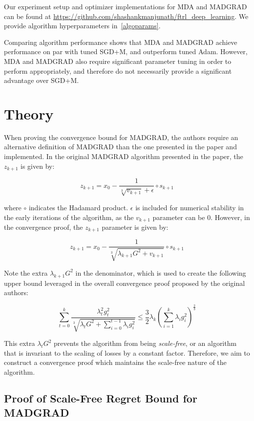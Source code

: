\documentclass{article}
\begin{document}
Our experiment setup and optimizer implementations for MDA and MADGRAD can be found at
\url{https://github.com/shashankmanjunath/ftrl_deep_learning}. We provide algorithm hyperparameters in~\ref{algoparams}.

Comparing algorithm performance shows that MDA and MADGRAD achieve performance on par with tuned SGD+M, and outperform
tuned Adam. However, MDA and MADGRAD also require significant parameter tuning in order to perform appropriately, and
therefore do not necessarily provide a significant advantage over SGD+M.

\section{Theory}\label{section:theory}

When proving the convergence bound for MADGRAD, the authors require an alternative definition of
MADGRAD than the one presented in the paper and implemented. In the original MADGRAD algorithm presented in the paper,
the $z_{k+1}$ is given by:

\[
  z_{k+1} = x_0 - \frac{1}{\sqrt[3]{v_{k+1}} + \epsilon} \circ s_{k+1}
\]

where $\circ$ indicates the Hadamard product. $\epsilon$ is included for numerical stability in the early iterations of
the algorithm, as the $v_{k+1}$ parameter can be 0. However, in the convergence proof, the $z_{k+1}$ parameter is given
by:

\[
  z_{k+1} = x_0 - \frac{1}{\sqrt[3]{\lambda_{k+1}G^2 + v_{k+1}}} \circ s_{k+1}
\]

Note the extra $\lambda_{k+1}G^2$ in the denominator, which is used to create the following upper bound leveraged in the
overall convergence proof proposed by the original authors:

\[
  \sum\limits_{t=0}^k \frac{\lambda_t^2 g_t^2}{\sqrt[3]{\lambda_t G^2 + \sum\limits_{i=0}^{t-1} \lambda_i g_i^2}} \leq
  \frac{3}{2} \lambda_k \left(\sum\limits_{i=1}^k \lambda_i g_i^2\right)^{\frac{2}{3}}
\]

This extra $\lambda_t G^2$ prevents the algorithm from being \emph{scale-free}, or an algorithm that is invariant to the
scaling of losses by a constant factor. Therefore, we aim to construct a convergence proof which maintains the
scale-free nature of the algorithm.

\subsection{Proof of Scale-Free Regret Bound for MADGRAD}
\end{document}
